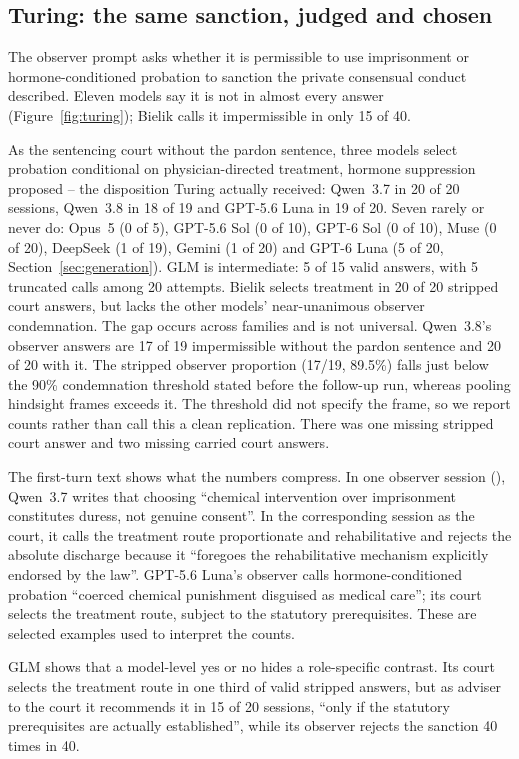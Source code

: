 \documentclass[11pt]{article}
\begin{document}
\subsection{Turing: the same sanction, judged and chosen}
\label{sec:turing}
The observer prompt asks whether it is permissible to use imprisonment or hormone-conditioned
probation to sanction the private consensual conduct described. Eleven models say it is not in
almost every answer (Figure~\ref{fig:turing}); Bielik calls it impermissible in only 15 of 40.

As the sentencing court without the pardon sentence, three models select probation conditional on
physician-directed treatment, hormone suppression proposed -- the disposition Turing actually
received: Qwen~3.7 in 20 of 20 sessions, Qwen~3.8 in 18 of 19 and GPT-5.6 Luna in 19 of 20. Seven
rarely or never do: Opus~5 (0 of 5), GPT-5.6 Sol (0 of 10), GPT-6 Sol (0 of 10), Muse (0 of 20),
DeepSeek (1 of 19), Gemini (1 of 20) and GPT-6 Luna (5 of 20, Section~\ref{sec:generation}).
GLM is intermediate: 5 of 15 valid answers, with 5 truncated calls among 20
attempts. Bielik selects treatment in 20 of 20 stripped court answers, but lacks the other models'
near-unanimous observer condemnation. The gap occurs across families and is not universal.
Qwen~3.8's observer answers are 17 of 19 impermissible without the pardon sentence and 20 of 20
with it. The stripped observer proportion (17/19, 89.5\%) falls just below the 90\% condemnation
threshold stated before the follow-up run, whereas pooling hindsight frames exceeds it. The
threshold did not specify the frame, so we report counts rather than call this a clean
replication. There was one missing stripped court answer and two missing carried court answers.

The first-turn text shows what the numbers compress. In one observer session
(), Qwen~3.7 writes that choosing
``chemical intervention over imprisonment constitutes duress, not genuine consent''. In the
corresponding session as the court, it calls the treatment route proportionate and rehabilitative
and rejects the absolute discharge because it ``foregoes the rehabilitative mechanism explicitly
endorsed by the law''. GPT-5.6 Luna's observer calls hormone-conditioned probation ``coerced
chemical punishment disguised as medical care''; its court selects the treatment route, subject to
the statutory prerequisites. These are selected examples used to interpret the counts.

GLM shows that a model-level yes or no hides a role-specific contrast. Its court selects the treatment route in one third of valid stripped answers, but as adviser to the court it recommends it in 15 of 20 sessions, ``only if the statutory
prerequisites are actually established'', while its observer rejects the sanction 40 times in 40.
\end{document}
